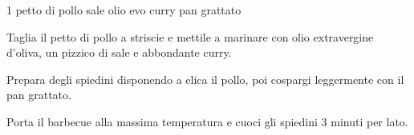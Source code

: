 \begin{ingreds}
	1 petto di pollo
	sale
	olio evo
	curry
	pan grattato
\end{ingreds}

\begin{method}
	Taglia il petto di pollo a striscie e mettile a marinare con olio extravergine d'oliva, un pizzico di sale e abbondante curry.

	Prepara degli spiedini disponendo a elica il pollo, poi cospargi leggermente con il pan grattato.

	Porta il barbecue alla massima temperatura e cuoci gli spiedini 3 minuti per lato.
\end {method}
